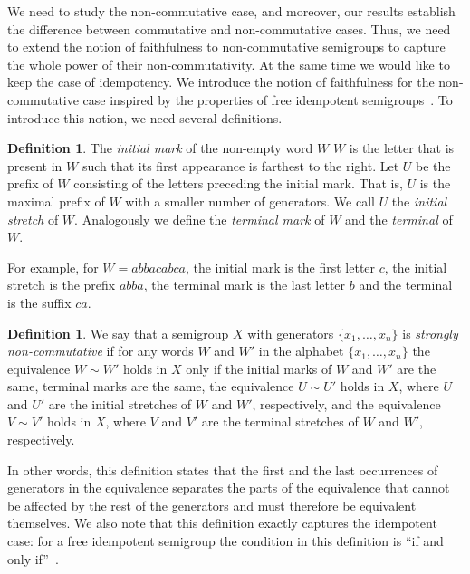 \documentclass[11pt]{article}
\numberwithin{equation}{section}
\theoremstyle{definition}
\newtheorem{definition}[theorem]{Definition}
\theoremstyle{plain}
\theoremstyle{plain}\newtheorem{observation}[theorem]{Observation}
\begin{document}
We need to study the non-commutative case, and moreover, our results
establish the difference between commutative and non-commutative cases. Thus,
we need to extend the notion of faithfulness to non-commutative semigroups to
capture %
the whole power of their non-commutativity.  %
At the same time we would
like to keep the case of idempotency. We introduce the notion of faithfulness
for the non-commutative case inspired by the properties of free idempotent
semigroups~\cite{GreenR52}. To introduce this notion, we need several
definitions.


\begin{definition}
The \emph{initial mark} of
the non-empty word $W$  %
$W$ is the letter that is present in $W$ such that
its first appearance is farthest to the right. Let $U$ be the prefix of $W$
consisting of
the  %
letters preceding the initial mark. That is, $U$ is the maximal
prefix of $W$ with a smaller number of generators. We call $U$ the
%
%
%
%
\emph{initial stretch} %
of $W$. Analogously we define the \emph{terminal mark} of $W$ and
the \emph{terminal} of $W$.
\end{definition}

For example, for $W = abbacabca$, the initial mark is the first letter $c$, the
%
%
initial stretch %
is
the prefix $abba$, the terminal mark is the last letter $b$ and the terminal is the suffix $ca$.

\begin{definition}\label{def:strong_non_commutativity}
We say that a semigroup $X$ with generators $\{x_1,\ldots, x_n\}$ is
\emph{strongly non-commutative} if for any words $W$ and $W'$ in the
alphabet $\{x_1,\ldots, x_n\}$ the equivalence $W\sim W'$ holds in $X$ only if
the initial marks of $W$ and $W'$ are the same, terminal marks are the same,
the equivalence $U \sim U'$ holds in $X$, where $U$ and $U'$ are the
%
%
initial stretches %
of
$W$ and $W'$, respectively, and the equivalence $V \sim V'$ holds in $X$, where
$V$ and $V'$ are the %
terminal stretches  %
of $W$ and $W'$, respectively.
\end{definition}

In other words, this definition states that the first and the last occurrences
of generators in the equivalence separates the parts of the equivalence that
cannot be affected by the rest of the generators and must therefore be
equivalent themselves. We also note that this definition exactly captures the
idempotent case: for a free idempotent semigroup the condition in this
definition is ``if and only if''~\cite{GreenR52}.
\end{document}
